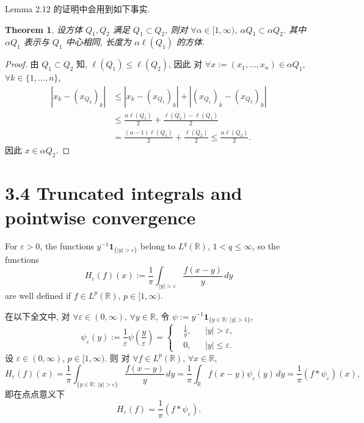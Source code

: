 \documentclass[a4paper,11pt]{article}
\newtheorem{theorem}{Theorem}[section]
\theoremstyle{definition}
\begin{document}
\begin{CJK*}{UTF8}{gbsn}
Lemma 2.12 的证明中会用到如下事实.

\begin{theorem}
    设方体 $ Q_1, Q_2 $ 满足 $ Q_1 \subset Q_2 $, 
    则对 $ \forall \alpha \in [1, \infty) $, 
    $ \alpha Q_1 \subset \alpha Q_2 $. 其中 $ \alpha Q_1 $ 表示与 $ Q_1 $ 中心相同, 长度为 $ \alpha \ell(Q_1) $ 的方体.
\end{theorem}

\begin{proof}
    由 $ Q_1 \subset Q_2 $ 知, $ \ell(Q_1) \leq \ell(Q_2) $, 因此
    对 $ \forall x := (x_1, \ldots, x_n) \in \alpha Q_1 $, $ \forall k \in \{1, \ldots, n\} $,
    \begin{align*}
        |x_k - (x_{Q_2})_k| 
            &\leq |x_k - (x_{Q_1})_k| + |(x_{Q_1})_k - (x_{Q_2})_k| \\
            &\leq \frac{\alpha \ell(Q_1)}{2} + \frac{\ell(Q_2) - \ell(Q_1)}{2} \\
            &= \frac{(\alpha - 1) \ell(Q_1)}{2} + \frac{\ell(Q_2)}{2}
            \leq \frac{\alpha \ell(Q_2)}{2}.
    \end{align*}
    因此 $ x \in \alpha Q_2 $.
\end{proof}

\section*{3.4 Truncated integrals and pointwise convergence}

\begin{framed}
    For $ \varepsilon > 0 $, the functions $ y^{-1} \mathbf{1}_{\{|y| > \varepsilon\}} $  
    belong to $ L^q(\mathbb{R}) $, $ 1 < q \leq \infty $, so the functions
    $$
        H_\varepsilon (f) (x) 
            := \frac{1}{\pi} \int_{|y| > \varepsilon} \frac{f(x - y)}{y} \, dy 
    $$
    are well defined if $ f \in L^p(\mathbb{R}) $, $ p \in [1, \infty) $.
\end{framed}

在以下全文中, 对 $ \forall \varepsilon \in (0, \infty) $, $ \forall y \in \mathbb{R} $, 令
$ \psi := y^{-1} \mathbf{1}_{\{y \in \mathbb{R} :\ |y| > 1\}} $, 
$$
    \psi_\varepsilon(y) := \frac{1}{\varepsilon} \psi \left( \frac{y}{\varepsilon} \right) 
        = \left\{ \begin{aligned}
        &\frac{1}{y}, && |y| > \varepsilon, \\
        &0,           && |y| \leq \varepsilon.
    \end{aligned} \right.
$$
设 $ \varepsilon \in (0, \infty) $, $ p \in [1, \infty) $. 则
对 $ \forall f \in L^p(\mathbb{R}) $, $ \forall x \in \mathbb{R} $,
$$
    H_\varepsilon (f) (x) 
        = \frac{1}{\pi} \int_{\{y \in \mathbb{R}:\ |y| > \varepsilon\}} \frac{f(x - y)}{y} \, dy  
        = \frac{1}{\pi} \int_\mathbb{R} f(x - y) \psi_\varepsilon(y) \, dy 
        = \frac{1}{\pi} (f * \psi_\varepsilon)(x),
$$
即在点点意义下
$$
    H_\varepsilon (f) = \frac{1}{\pi} (f * \psi_\varepsilon).
$$


\end{CJK*}
\end{document}
